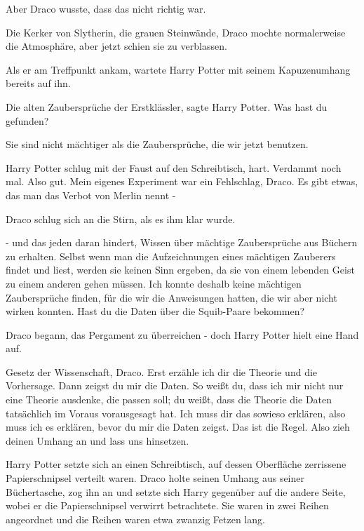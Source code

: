 Aber Draco wusste, dass das nicht richtig war.

Die Kerker von Slytherin, die grauen Steinwände, Draco mochte normalerweise die
Atmosphäre, aber jetzt schien sie zu verblassen.

Als er am Treffpunkt ankam, wartete Harry Potter mit seinem Kapuzenumhang
bereits auf ihn.

\glqq{}Die alten Zaubersprüche der Erstklässler\grqq{}, sagte Harry Potter.
\glqq{}Was hast du gefunden?\grqq{}

\glqq{}Sie sind nicht mächtiger als die Zaubersprüche, die wir jetzt
benutzen.\grqq{}

Harry Potter schlug mit der Faust auf den Schreibtisch, hart. \glqq{}Verdammt
noch mal. Also gut. Mein eigenes Experiment war ein Fehlschlag, Draco. Es gibt
etwas, das man das Verbot von Merlin nennt -\grqq{}

Draco schlug sich an die Stirn, als es ihm klar wurde.

\glqq{}- und das jeden daran hindert, Wissen über mächtige Zaubersprüche aus
Büchern zu erhalten. Selbst wenn man die Aufzeichnungen eines mächtigen
Zauberers findet und liest, werden sie keinen Sinn ergeben, da sie von einem
lebenden Geist zu einem anderen gehen müssen. Ich konnte deshalb keine mächtigen
Zaubersprüche finden, für die wir die Anweisungen hatten, die wir aber nicht
wirken konnten. Hast du die Daten über die Squib-Paare bekommen?\grqq{}

Draco begann, das Pergament zu überreichen - doch Harry Potter hielt eine Hand
auf.

\glqq{}Gesetz der Wissenschaft, Draco. Erst erzähle ich dir die Theorie und die
Vorhersage. Dann zeigst du mir die Daten. So weißt du, dass ich mir nicht nur
eine Theorie ausdenke, die passen soll; du weißt, dass die Theorie die Daten
tatsächlich im Voraus vorausgesagt hat. Ich muss dir das sowieso erklären, also
muss ich es erklären, bevor du mir die Daten zeigst. Das ist die Regel. Also
zieh deinen Umhang an und lass uns hinsetzen.\grqq{}

Harry Potter setzte sich an einen Schreibtisch, auf dessen Oberfläche zerrissene
Papierschnipsel verteilt waren. Draco holte seinen Umhang aus seiner
Büchertasche, zog ihn an und setzte sich Harry gegenüber auf die andere Seite,
wobei er die Papierschnipsel verwirrt betrachtete. Sie waren in zwei Reihen
angeordnet und die Reihen waren etwa zwanzig Fetzen lang.

